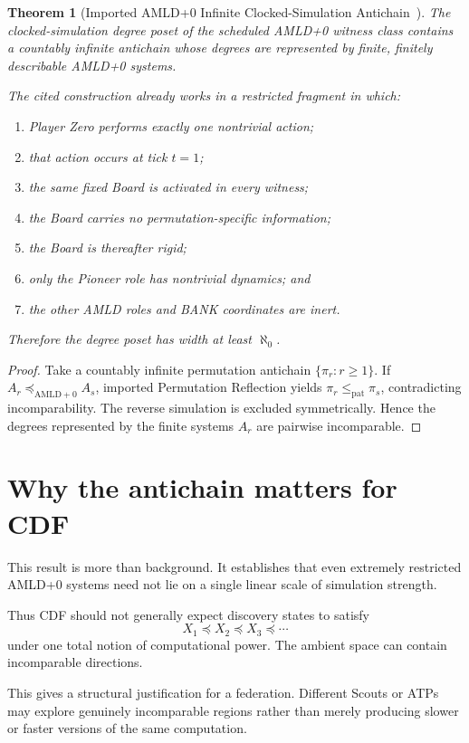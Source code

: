 \documentclass[11pt]{article}
\newtheorem{theorem}{Theorem}[section]
\theoremstyle{definition}
\begin{document}
\begin{theorem}[Imported AMLD+0 Infinite Clocked-Simulation Antichain~\cite{tenneson-antichain}]
The clocked-simulation degree poset of the scheduled AMLD+0 witness class contains a countably infinite antichain whose degrees are \emph{represented by finite, finitely describable AMLD+0 systems}.

The cited construction already works in a restricted fragment in which:
\begin{enumerate}[label=(\arabic*)]
\item Player Zero performs exactly one nontrivial action;
\item that action occurs at tick $t=1$;
\item the same fixed Board is activated in every witness;
\item the Board carries no permutation-specific information;
\item the Board is thereafter rigid;
\item only the Pioneer role has nontrivial dynamics; and
\item the other AMLD roles and BANK coordinates are inert.
\end{enumerate}
Therefore the degree poset has width at least $\aleph_0$.
\end{theorem}

\begin{proof}
Take a countably infinite permutation antichain $\{\pi_r:r\ge1\}$. If $A_r\preceq_{\mathrm{AMLD+0}}A_s$, imported Permutation Reflection yields $\pi_r\le_{\mathrm{pat}}\pi_s$, contradicting incomparability. The reverse simulation is excluded symmetrically. Hence the degrees represented by the finite systems $A_r$ are pairwise incomparable.
\end{proof}

\section{Why the antichain matters for CDF}

This result is more than background. It establishes that even extremely restricted AMLD+0 systems need not lie on a single linear scale of simulation strength.

Thus CDF should not generally expect discovery states to satisfy
\[
X_1\preceq X_2\preceq X_3\preceq\cdots
\]
under one total notion of computational power. The ambient space can contain incomparable directions.

This gives a structural justification for a federation. Different Scouts or ATPs may explore genuinely incomparable regions rather than merely producing slower or faster versions of the same computation.
\end{document}
